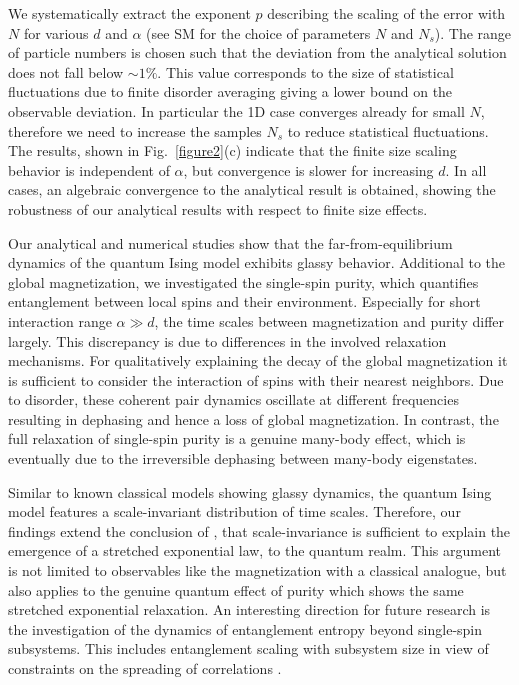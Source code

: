 \documentclass[aps,twocolumn,
superscriptaddress,
footinbib,
prl]{revtex4-1}
\begin{document}
 
We systematically extract the exponent $p$ describing the scaling of the error with $N$ for various $d$ and $\alpha$ (see SM \cite{SM} for the choice of parameters $N$ and $N_s$). The range of particle numbers is chosen such that the deviation from the analytical solution does not fall below $\sim 1\%$. This value corresponds to the size of statistical fluctuations due to finite disorder averaging giving a lower bound on the observable deviation. In particular the 1D case converges already for small $N$, therefore we need to increase the samples $N_s$ to reduce statistical fluctuations. The results, shown in Fig.~\ref{figure2}(c) indicate that the finite size scaling behavior is independent of $\alpha$, but convergence is slower for increasing $d$. In all cases, an algebraic convergence to the analytical result is obtained, showing the robustness of our analytical results with respect to finite size effects. 

Our analytical and numerical studies show that the far-from-equilibrium dynamics of the quantum Ising model exhibits glassy behavior. Additional to the global magnetization, we investigated the single-spin purity, which quantifies entanglement between local spins and their environment. 
Especially for short interaction range $\alpha \gg d$, the time scales between magnetization and purity differ largely. This discrepancy is due to differences in the involved relaxation mechanisms. For qualitatively explaining the decay of the global magnetization it is sufficient to consider the interaction of spins with their nearest neighbors. Due to disorder, these coherent pair dynamics oscillate at different frequencies resulting in dephasing and hence a loss of global magnetization. 
In contrast, the full relaxation of single-spin purity is a genuine many-body effect, which is eventually due to the irreversible dephasing between many-body eigenstates.

Similar to known classical models showing glassy dynamics, the quantum Ising model features a scale-invariant distribution of time scales. Therefore, our findings extend the conclusion of \cite{Klafter1986OnSystems}, that scale-invariance is sufficient to explain the emergence of a stretched exponential law, to the quantum realm. This argument is not limited to observables like the magnetization with a classical analogue, but also applies to the genuine quantum effect of purity which shows the same stretched exponential relaxation. An interesting direction for future research is the investigation of the dynamics of entanglement entropy beyond single-spin subsystems. This includes entanglement scaling with subsystem size \cite{Abanin2019MBLEntanglement, Hertzberg2011Wilcek} in view of constraints on the spreading of correlations \cite{Lieb1972TheSystems,PhysRevLett.113.030602,PhysRevLett.114.157201,Hastings2006}.
\end{document}
